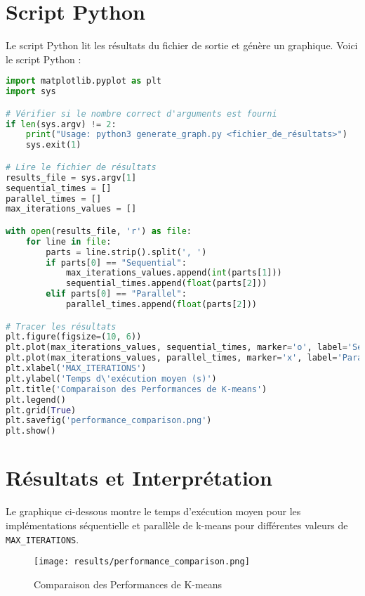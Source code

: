 \documentclass{article}
\begin{document}
\section{Script Python}
Le script Python lit les résultats du fichier de sortie et génère un graphique. Voici le script Python :

\begin{lstlisting}[language=python, caption=Script Python pour générer le graphique]
import matplotlib.pyplot as plt
import sys

# Vérifier si le nombre correct d'arguments est fourni
if len(sys.argv) != 2:
    print("Usage: python3 generate_graph.py <fichier_de_résultats>")
    sys.exit(1)

# Lire le fichier de résultats
results_file = sys.argv[1]
sequential_times = []
parallel_times = []
max_iterations_values = []

with open(results_file, 'r') as file:
    for line in file:
        parts = line.strip().split(', ')
        if parts[0] == "Sequential":
            max_iterations_values.append(int(parts[1]))
            sequential_times.append(float(parts[2]))
        elif parts[0] == "Parallel":
            parallel_times.append(float(parts[2]))

# Tracer les résultats
plt.figure(figsize=(10, 6))
plt.plot(max_iterations_values, sequential_times, marker='o', label='Séquentiel')
plt.plot(max_iterations_values, parallel_times, marker='x', label='Parallèle')
plt.xlabel('MAX_ITERATIONS')
plt.ylabel('Temps d\'exécution moyen (s)')
plt.title('Comparaison des Performances de K-means')
plt.legend()
plt.grid(True)
plt.savefig('performance_comparison.png')
plt.show()
\end{lstlisting}

\section{Résultats et Interprétation}
Le graphique ci-dessous montre le temps d'exécution moyen pour les implémentations séquentielle et parallèle de k-means pour différentes valeurs de \texttt{MAX\_ITERATIONS}.

\begin{figure}[h]
    \centering
    \texttt{[image: results/performance\_comparison.png]}
    \caption{Comparaison des Performances de K-means}
    \label{fig:performance}
\end{figure}
\end{document}
